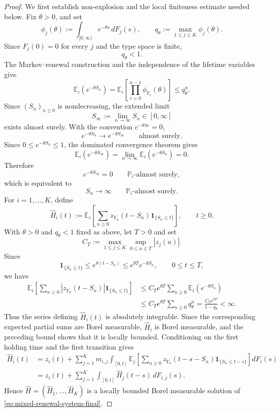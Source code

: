 \documentclass[reqno,final,11pt]{amsart}
\newcommand{\E}{\mathbb E}
\newcommand{\Pbb}{\mathbb P}
\newcommand{\ind}[1]{\mathbf 1_{\{#1\}}}
\theoremstyle{plain}
\theoremstyle{definition}
\theoremstyle{remark}
\numberwithin{equation}{section}
\begin{document}
\begin{proof}
We first establish non-explosion and the local finiteness estimate needed below. Fix \(\theta>0\), and set
\[
  \phi_j(\theta):=
  \int_{[0,\infty)}e^{-\theta s}\,dF_j(s),
  \qquad
  q_\theta:=\max_{1\le j\le K}\phi_j(\theta).
\]
Since \(F_j(0)=0\) for every \(j\) and the type space is finite,
\[
  q_\theta<1.
\]
The Markov--renewal construction and the independence of the lifetime variables give
\[
  \E_i\left(e^{-\theta S_n}\right)
  =
  \E_i\left[
    \prod_{r=0}^{n-1}\phi_{Y_r}(\theta)
  \right]
  \le q_\theta^n.
\]
Since \((S_n)_{n\ge0}\) is nondecreasing, the extended limit
\[
  S_\infty:=\lim_{n\to\infty}S_n
  \in[0,\infty]
\]
exists almost surely. With the convention \(e^{-\theta\infty}=0\),
\[
  e^{-\theta S_n}\longrightarrow e^{-\theta S_\infty}
  \qquad\text{almost surely}.
\]
Since \(0\le e^{-\theta S_n}\le1\), the dominated convergence theorem gives
\[
  \E_i\left(e^{-\theta S_\infty}\right)
  =
  \lim_{n\to\infty}\E_i\left(e^{-\theta S_n}\right)
  =0.
\]
Therefore
\[
  e^{-\theta S_\infty}=0
  \qquad \Pbb_i\text{-almost surely},
\]
which is equivalent to
\[
  S_n\longrightarrow\infty
  \qquad \Pbb_i\text{-almost surely}.
\]
For \(i=1,\dots,K\), define
\[
  \widehat H_i(t):=
  \E_i\left[
    \sum_{n\ge0}
    z_{Y_n}(t-S_n)\ind{S_n\le t}
  \right],
  \qquad t\ge0.
\]
With \(\theta>0\) and \(q_\theta<1\) fixed as above, let \(T>0\) and set
\[
  C_T:=
  \max_{1\le j\le K}\sup_{0\le u\le T}|z_j(u)|.
\]
Since
\[
  \ind{S_n\le t}
  \le e^{\theta(t-S_n)}
  \le e^{\theta T}e^{-\theta S_n},
  \qquad 0\le t\le T,
\]
we have
\[
\begin{split}
  \E_i\left[
    \sum_{n\ge0}
    |z_{Y_n}(t-S_n)|\ind{S_n\le t}
  \right]
  &\le
  C_Te^{\theta T}
  \sum_{n\ge0}\E_i\left(e^{-\theta S_n}\right)\\
  &\le
  C_Te^{\theta T}\sum_{n\ge0}q_\theta^n
  =
  \frac{C_Te^{\theta T}}{1-q_\theta}
  <\infty.
\end{split}
\]
Thus the series defining \(\widehat H_i(t)\) is absolutely integrable. Since the corresponding expected partial sums are Borel measurable, \(\widehat H_i\) is Borel measurable, and the preceding bound shows that it is locally bounded. Conditioning on the first holding time and the first transition gives
\[
\begin{split}
  \widehat H_i(t)
  &=
  z_i(t)
  +
  \sum_{j=1}^K m_{i,j}\int_{[0,t]}
  \E_j\left[
    \sum_{n\ge0}
    z_{Y_n}(t-s-S_n)\ind{S_n\le t-s}
  \right]dF_i(s)\\
  &=
  z_i(t)
  +
  \sum_{j=1}^K
  \int_{[0,t]}\widehat H_j(t-s)\,dF_{i,j}(s).
\end{split}
\]
Hence \(\widehat H=(\widehat H_1,\dots,\widehat H_K)\) is a locally bounded Borel measurable solution of \eqref{eq:mixed-renewal-system-final}.


\end{proof}
\end{document}
